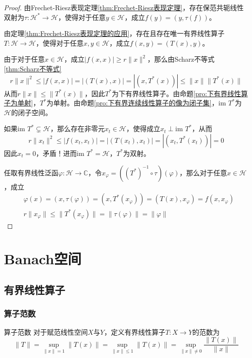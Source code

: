 \documentclass[lang = cn, scheme = chinese, thmcnt = section]{elegantbook}
\newcommand{\C}{\mathbb{C}}  		   %
\newcommand{\im}{\text{im }}           %
\begin{document}
\begin{proof}
	由Frechet-Riesz表现定理\ref{thm:Frechet-Riesz表现定理}，存在保范共轭线性双射为$\tau:\mathcal{H}^*\to \mathcal{H}$，使得对于任意$y\in \mathcal{H}$，成立$f(y)=(y,\tau(f))$。
	
	由定理\ref{thm:Frechet-Riesz表现定理的应用}，存在且存在唯一有界线性算子$T:\mathcal{H}\to\mathcal{H}$，使得对于任意$x,y\in \mathcal{H}$，成立$f(x,y)=(T(x),y)$。
	
	由于对于任意$x\in \mathcal{H}$，成立$|f(x,x)|\ge r\|x\|^2$，那么由Scharz不等式\ref{thm:Scharz不等式}
	$$
	r\|x\|^2\le |f(x,x)|=|(T(x),x)|=|(x,T^*(x))|\le \|x\|\|T^*(x)\|
	$$
	从而$r\|x\|\le\|T^*(x)\|$，因此$T^*$为下有界线性算子。由命题\ref{pro:下有界线性算子为单射}，$T^*$为单射。由命题\ref{pro:下有界连续线性算子的像为闭子集}，$\im T^*$为$\mathcal{H}$的闭子空间。
	
	如果$\im T^*\subsetneq \mathcal{H}$，那么存在非零元$x_t\in\mathcal{H}$，使得成立$x_t\perp\im T^*$，从而
	$$
	r\|x_t\|^2\le |f(x_t,x_t)|=|(T(x_t),x_t)|=|(x_t,T^*(x_t))|=0
	$$
	因此$x_t=0$，矛盾！进而$\im T^*=\mathcal{H}$，$T^*$为双射。
	
	任取有界线性泛函$\varphi:\mathcal{H}\to \C$，令$x_\varphi=((T^*)^{-1}\circ\tau)(\varphi)$，那么对于任意$x\in \mathcal{H}$，成立
	\begin{align*}
		&\varphi(x)=(x,\tau(\varphi))=(x,T^*(x_\varphi))=(T(x),x_\varphi)=f(x,x_\varphi)\\
		&r\|x_\varphi\|\le \| T^*(x_\varphi) \|=\| \tau(\varphi)\|=\|\varphi\|
	\end{align*}
\end{proof}

\chapter{Banach空间}

\section{有界线性算子}

\subsection{算子范数}

\begin{definition}{算子范数}
	对于赋范线性空间$X$与$Y$，定义有界线性算子$T:X\to Y$的范数为
	$$
	\|T\|=\sup_{\|x\|=1}\|T(x)\|=\sup_{\|x\|\le1}\|T(x)\|=\sup_{\|x\|\ne0}\frac{\|T(x)\|}{\|x\|}
	$$
\end{definition}
\end{document}
